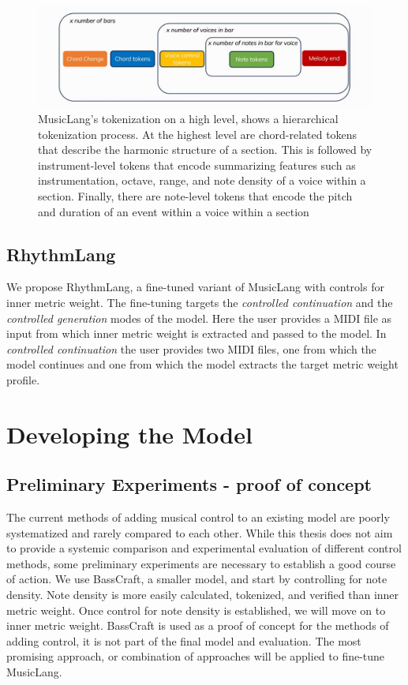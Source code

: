 \begin{figure}[H]
\centering
\includegraphics[width=1\textwidth]{IMAGES/MusicLang.JPG} 
\caption{MusicLang's tokenization on a high level, shows a hierarchical tokenization process. At the highest level are chord-related tokens that describe the harmonic structure of a section. This is followed by instrument-level tokens that encode summarizing features such as instrumentation, octave, range, and note density of a voice within a section. Finally, there are note-level tokens that encode the pitch and duration of an event within a voice within a section}
\label{fig:musiclangtok}
\end{figure}

\subsection{RhythmLang}
We propose RhythmLang, a fine-tuned variant of MusicLang with controls for inner metric weight. The fine-tuning targets the \textit{controlled continuation} and the \textit{controlled generation} modes of the model. Here the user provides a MIDI file as input from which inner metric weight is extracted and passed to the model. In \textit{controlled continuation} the user provides two MIDI files, one from which the model continues and one from which the model extracts the target metric weight profile. 


\section{Developing the Model}


\subsection{Preliminary Experiments - proof of concept}
The current methods of adding musical control to an existing model are poorly systematized and rarely compared to each other. While this thesis does not aim to provide a systemic comparison and experimental evaluation of different control methods, some preliminary experiments are necessary to establish a good course of action. We use BassCraft, a smaller model, and start by controlling for note density. Note density is more easily calculated, tokenized, and verified than inner metric weight. Once control for note density is established, we will move on to inner metric weight. BassCraft is used as a proof of concept for the methods of adding control, it is not part of the final model and evaluation. The most promising approach, or combination of approaches will be applied to fine-tune MusicLang. 

